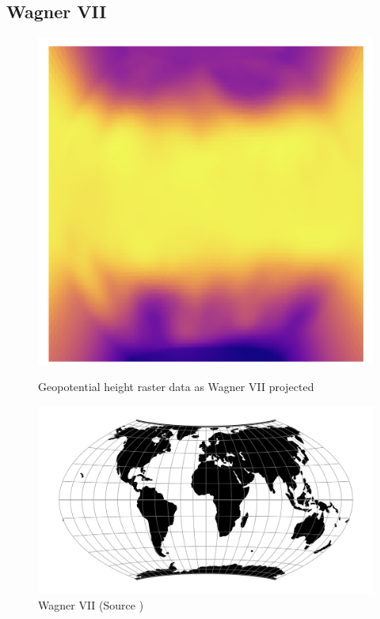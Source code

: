 \subsection{Wagner VII}
\begin{figure}[H]
    \centering
    \begin{minipage}{0.30\textwidth}
        \centering
        \includegraphics[width=0.9\linewidth]{figures/chapter-8/geopoth_wag.png}
        \caption{ Geopotential height raster data as Wagner VII projected}
        \label{fig:wag_geopoth_raster}
    \end{minipage}\hfill
    \begin{minipage}{0.30\textwidth}
        \centering
        \includegraphics[width=0.9\linewidth]{figures/chapter-8/wag7.png}
        \caption{Wagner VII (Source \cite{PROJ_SITE})}
        \label{fig:wag_proj}
    \end{minipage}\hfill

\end{figure}
